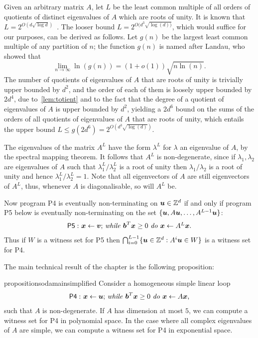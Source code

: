 Given an arbitrary matrix $A$, let $L$ be the least common multiple of
all orders of quotients of distinct eigenvalues of $A$ which are roots
of unity. It is known that $L=2^{O(d\sqrt{\log d})}$~\cite[Theorem 1.2]{BOOK}.
The looser bound $L = 2^{O(d^{3} \sqrt{\log(d))}}$, which would suffice
for our purposes, can be derived as follows.
Let $g(n)$ be the largest least common multiple of any partition of $n$;
the function $g(n)$ is named after Landau, who showed that
\[ \lim\limits_{n \rightarrow \infty} \ln(g(n)) = (1+o(1)) \sqrt{n \ln(n)}. \]
The number of quotients of eigenvalues of $A$ that are roots of unity is
trivially upper bounded by $d^{2}$, and the order of each of them is
loosely upper bounded by $2d^{4}$, due to~\cref{lem:totient} and to the fact
that the degree of a quotient of eigenvalues of $A$ is upper bounded by $d^{2}$,
yielding a $2d^{6}$ bound on the sums of the orders of all quotients of eigenvalues
of $A$ that are roots of unity, which entails the upper bound
$L \leq g(2d^{6}) = 2^{O(d^{3} \sqrt{\log(d)})}$.

The eigenvalues of the matrix $A^L$ have the form $\lambda^L$ for
$\lambda$ an eigenvalue of $A$, by the spectral mapping theorem.  It follows that
$A^L$ is non-degenerate, since if $\lambda_1,\lambda_2$ are
eigenvalues of $A$ such that $\lambda^L_1/\lambda^L_2$ is a root of
unity then $\lambda_1/\lambda_2$ is a root of unity and hence
$\lambda^L_1/\lambda^L_2=1$.
Note that all eigenvectors of $A$ are still eigenvectors of $A^L$,
thus, whenever $A$ is diagonalisable, so will $A^L$ be.

Now program \textsf{P4} is eventually non-terminating on
$\boldsymbol{u}\in \mathbb{Z}^{d}$ if and only if program \textsf{P5}
below is eventually non-terminating on the set
$\lbrace \boldsymbol{u},A\boldsymbol{u}, \ldots,A^{L-1}\boldsymbol{u}\rbrace$:
\begin{gather*}
\mathsf{P5:}\ \mbox{$\boldsymbol{x}\gets \boldsymbol{v}$;
\textit{while} $\boldsymbol b^T\boldsymbol{x} \geq 0$ \textit{do} $\boldsymbol{x}\leftarrow A^L\boldsymbol{x}$.}
\end{gather*}
Thus if $W$ is a witness set for \textsf{P5} then $\bigcap_{i=0}^{L-1}
\lbrace \boldsymbol{u} \in \mathbb{Z}^{d} : A^i\boldsymbol{u} \in W\rbrace$ is a witness set for
\textsf{P4}.

The main technical result of the chapter is the following proposition:
\begin{restatable}{proposition}{sodamainsimplified}
\label{prop:soda-main-simplified}
Consider a homogeneous simple linear loop
\begin{gather*}
\mathsf{P4:}\ \mbox{$\boldsymbol{x}\gets \boldsymbol{u}$;
\textit{while} $\boldsymbol{b}^T\boldsymbol{x} \geq 0$ \textit{do} $\boldsymbol{x}\leftarrow A\boldsymbol{x}$,}
\end{gather*}
such that $A$ is non-degenerate. If $A$ has dimension at most $5$, we can compute a witness set for \textsf{P4} in polynomial space.
In the case where all complex eigenvalues of $A$ are simple, we can compute a witness set for \textsf{P4} in exponential space.
\end{restatable}

